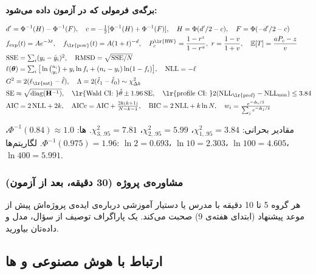 \textbf{برگه‌ی فرمولی که در آزمون داده می‌شود:}

\[
\begin{aligned}
&d' = \Phi^{-1}(H) - \Phi^{-1}(F), \quad c = -\tfrac12[\Phi^{-1}(H) + \Phi^{-1}(F)], \quad H = \Phi(d'/2 - c), \quad F = \Phi(-d'/2 - c)\\
&f_{\exp}(t) = A e^{-\lambda t}, \quad f_{\text{\lr{pow}}}(t) = A(1+t)^{-d}, \quad P_c^{\text{\lr{RW}}} = \frac{1-r^z}{1-r^a},\ r = \frac{1-v}{1+v}, \quad \mathbb{E}[T] = \frac{aP_c - z}{v}\\
&\mathrm{SSE} = \textstyle\sum_i (y_i - \hat y_i)^2, \quad \mathrm{RMSD} = \sqrt{\mathrm{SSE}/N}\\
&\ell(\boldsymbol\theta) = \textstyle\sum_i \big[\ln\binom{n_i}{y_i} + y_i\ln f_i + (n_i - y_i)\ln(1-f_i)\big], \quad \mathrm{NLL} = -\ell\\
&G^2 = 2(\ell_{\text{\lr{sat}}} - \hat\ell), \quad \Lambda = 2(\hat\ell_1 - \hat\ell_0) \sim \chi^2_{\Delta k}\\
&\mathrm{SE} \approx \sqrt{\mathrm{diag}(\mathbf{H}^{-1})}, \quad \text{\lr{Wald CI: }} \hat\theta \pm 1.96\,\mathrm{SE}, \quad \text{\lr{profile CI: }} 2(\mathrm{NLL}_{\text{\lr{prof}}} - \mathrm{NLL}_{\min}) \le 3.84\\
&\mathrm{AIC} = 2\,\mathrm{NLL} + 2k, \quad \mathrm{AICc} = \mathrm{AIC} + \tfrac{2k(k+1)}{N-k-1}, \quad \mathrm{BIC} = 2\,\mathrm{NLL} + k\ln N, \quad w_i = \tfrac{e^{-\Delta_i/2}}{\sum_j e^{-\Delta_j/2}}
\end{aligned}
\]

مقادیر بحرانی: \(\chi^2_{1,.95} = 3.84\)، \(\chi^2_{2,.95} = 5.99\)،
\(\chi^2_{3,.95} = 7.81\). ها:
\(\Phi^{-1}(0.84) \approx 1.0\)، \(\Phi^{-1}(0.975) = 1.96\). لگاریتم‌ها:
\(\ln 2 = 0.693\)، \(\ln 10 = 2.303\)، \(\ln 100 = 4.605\)،
\(\ln 400 = 5.991\).

\subsubsection{مشاوره‌ی پروژه (30 دقیقه، بعد از آزمون)}

هر گروه 5 تا 10 دقیقه با مدرس یا دستیار آموزشی درباره‌ی ایده‌ی پروژه‌اش پیش
از موعد پیشنهاد (ابتدای هفته‌ی 9) صحبت می‌کند. یک پاراگراف توصیف از سؤال،
مدل و داده‌تان بیاورید.

\subsection{\texorpdfstring{ارتباط با هوش مصنوعی و
ها}{ارتباط با هوش مصنوعی و LLMها}}


